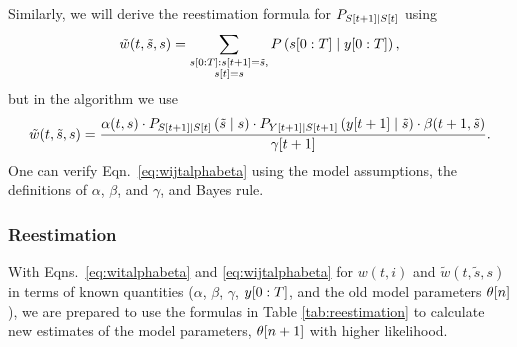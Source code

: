 Similarly, we will derive the reestimation formula for
$P_{{S}{[t+1]}\mid {S}{[t]}}$ using
\begin{equation}
  \label{eq:wijtFFE}
  {\tilde w}(t,{\tilde s},s) = \sum_{\substack{s[0:T]:{s}{[t+1]}={\tilde s},\\{s}{[t]}=s}}
  P \left(s[0:T]\mid y[0:T] \right),
\end{equation}
but in the algorithm we use
\begin{equation}
  \label{eq:wijtalphabeta}
  {\tilde w}(t,{\tilde s},s) = \frac{ \alpha(t,s) \cdot P_{{S}{[t+1]}\mid {S}{[t]}}
    \left({\tilde s}\mid s \right)  \cdot P_{{Y}{[t+1]}\mid {S}{[t+1]}}
    \left({y}{[t+1]}\mid {\tilde s} \right) \cdot \beta(t+1,{\tilde s}) }
  {{\gamma}{[t+1]}}.
\end{equation}
One can verify Eqn.~\eqref{eq:wijtalphabeta} using the model
assumptions, the definitions of $\alpha$, $\beta$, and $\gamma$, and
Bayes rule.

\subsubsection{Reestimation}

With Eqns.~\eqref{eq:witalphabeta} and \eqref{eq:wijtalphabeta} for
$w(t,i)$ and ${\tilde w}(t,{\tilde s},s)$ in terms of known quantities
($\alpha$, $\beta$, $\gamma$, $y[0:T]$, and the old model
parameters ${\theta}{[n]}$), we are prepared to use the formulas
in Table \ref{tab:reestimation} to calculate new estimates of the
model parameters, ${\theta}{[n+1]}$ with higher likelihood.

